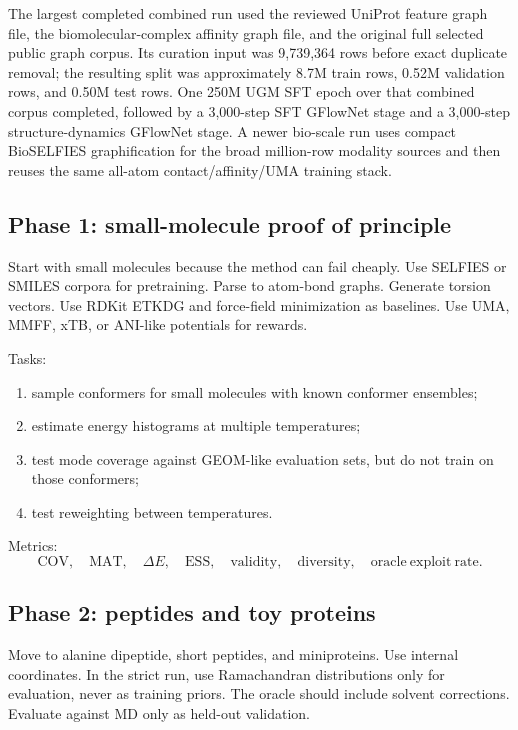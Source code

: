 \documentclass[11pt]{article}
\begin{document}
The largest completed combined run used the reviewed UniProt feature graph file, the biomolecular-complex affinity graph file, and the original full selected public graph corpus. Its curation input was 9,739,364 rows before exact duplicate removal; the resulting split was approximately 8.7M train rows, 0.52M validation rows, and 0.50M test rows. One 250M UGM SFT epoch over that combined corpus completed, followed by a 3,000-step SFT GFlowNet stage and a 3,000-step structure-dynamics GFlowNet stage. A newer bio-scale run uses compact BioSELFIES graphification for the broad million-row modality sources and then reuses the same all-atom contact/affinity/UMA training stack.

\subsection{Phase 1: small-molecule proof of principle}

Start with small molecules because the method can fail cheaply. Use SELFIES or SMILES corpora for pretraining. Parse to atom-bond graphs. Generate torsion vectors. Use RDKit ETKDG and force-field minimization as baselines. Use UMA, MMFF, xTB, or ANI-like potentials for rewards.

Tasks:
\begin{enumerate}[leftmargin=2em]
  \item sample conformers for small molecules with known conformer ensembles;
  \item estimate energy histograms at multiple temperatures;
  \item test mode coverage against GEOM-like evaluation sets, but do not train on those conformers;
  \item test reweighting between temperatures.
\end{enumerate}

Metrics:
\[
\mathrm{COV},\quad \mathrm{MAT},\quad
\Delta E,\quad
\mathrm{ESS},\quad
\mathrm{validity},\quad
\mathrm{diversity},\quad
\mathrm{oracle\ exploit\ rate}.
\]

\subsection{Phase 2: peptides and toy proteins}

Move to alanine dipeptide, short peptides, and miniproteins. Use internal coordinates. In the strict run, use Ramachandran distributions only for evaluation, never as training priors. The oracle should include solvent corrections. Evaluate against MD only as held-out validation.
\end{document}
